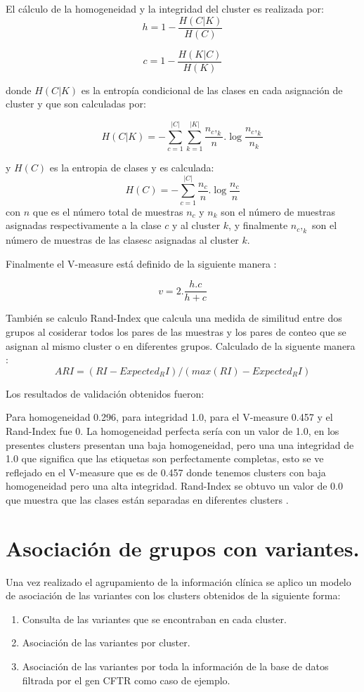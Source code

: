 El cálculo de la homogeneidad y la integridad del cluster es realizada por:
$$h=1- \frac{H(C|K)}{H(C)} $$

$$c=1- \frac{H(K|C)}{H(K)}$$

donde $H(C|K)$ es la entropía condicional de las clases en cada asignación de cluster y que son calculadas por:

$$H(C|K)= - \sum_{c=1}^{|C|} \sum_{k=1}^{|K|} \frac{n_c,_k}{n} . \log \frac{n_c,_k}{n_k}$$ 

y $H(C)$ es la entropia de clases y es calculada:
$$H(C)=  - \sum_{c=1}^{|C|} \frac{n_c}{n} . \log \frac{n_c}{n}$$ 
con $n$ que es el número total de muestras $n_c$ y $n_k$ son el número de muestras asignadas respectivamente a la clase $c$ y al cluster $k$, y finalmente $n_c,_k$ son el número de muestras de las clases$c$ asignadas al cluster $k$.

Finalmente el V-measure está definido de la siguiente manera \cite{Rosenberg2007}:

$$v= 2.\frac{h.c}{h+c}$$

También se calculo Rand-Index que calcula una medida de similitud entre dos grupos al cosiderar todos los pares de las muestras y los pares de conteo que se asignan al mismo cluster o en diferentes grupos. Calculado de la siguente manera \cite{scikit-learn}:
$$ARI = (RI - Expected_RI) / (max(RI) - Expected_RI)$$

Los resultados de validación obtenidos fueron:

Para homogeneidad 0.296, para integridad 1.0, para el V-measure 0.457 y el Rand-Index fue 0. La homogeneidad perfecta sería con un valor de 1.0, en los presentes clusters presentan una baja homogeneidad, pero una una integridad de 1.0 que significa que las etiquetas son perfectamente completas, esto se ve reflejado en el V-measure que es de 0.457 donde tenemos clusters con baja homogeneidad pero una alta integridad.  Rand-Index se obtuvo un valor de 0.0 que muestra que las clases están separadas en diferentes clusters \cite{scikit-learn}. 

\section{Asociación de grupos con variantes.}

Una vez realizado el agrupamiento de la información clínica se aplico un modelo de asociación de las variantes con los clusters obtenidos de la siguiente forma:

\begin{enumerate}
	\item Consulta de las variantes que se encontraban en cada cluster.
	\item Asociación de las variantes por cluster.
	\item Asociación de las variantes por toda la información de la base de datos filtrada por el gen CFTR como caso de ejemplo.
\end{enumerate}

